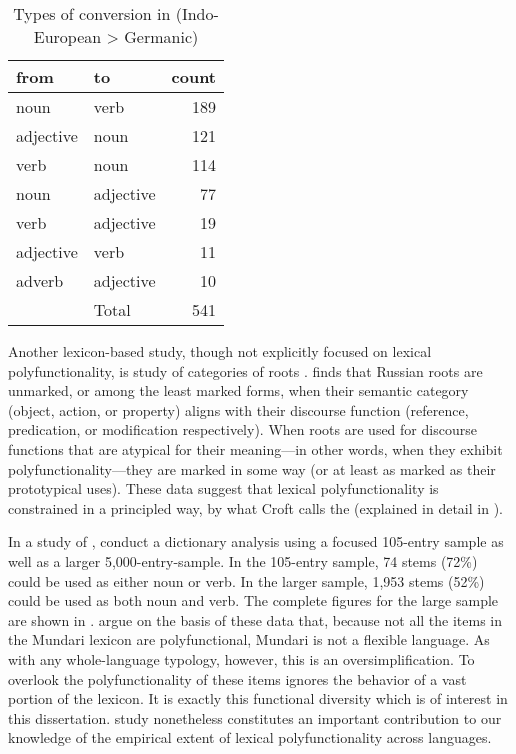\begin{table}[h]
  \centering
  \caption[Types of conversion in English (Indo-European > Germanic)]{Types of conversion in  (Indo-European > Germanic) \parencite[416]{Cannon1985}}
  \label{tab:Cannon-1985}
  \begin{tabular}{ l l r }
    \toprule
    from      & to        & count\\
    \midrule
    noun      & verb      & 189\\
    adjective & noun      & 121\\
    verb      & noun      & 114\\
    noun      & adjective & 77\\
    verb      & adjective & 19\\
    adjective & verb      & 11\\
    adverb    & adjective & 10\\
    \midrule
    { }       & Total     & 541\\
    \bottomrule
  \end{tabular}
\end{table}

Another lexicon-based study, though not explicitly focused on lexical polyfunctionality, is  study of categories of  roots . \citeauthor{Croft1991} finds that Russian roots are unmarked, or among the least marked forms, when their semantic category (object, action, or property) aligns with their discourse function (reference, predication, or modification respectively). When roots are used for discourse functions that are atypical for their meaning—in other words, when they exhibit polyfunctionality—they are marked in some way (or at least as marked as their prototypical uses). These data suggest that lexical polyfunctionality is constrained in a principled way, by what Croft calls the  (explained in detail in ).

In a study of , \textcite{EvansOsada2005} conduct a dictionary analysis using a focused 105-entry sample as well as a larger 5,000-entry-sample. In the 105-entry sample, 74 stems (72\%) could be used as either noun or verb. In the larger sample, 1,953 stems (52\%) could be used as both noun and verb. The complete figures for the large sample are shown in . \citeauthor{EvansOsada2005} argue on the basis of these data that, because not all the items in the Mundari lexicon are polyfunctional, Mundari is not a flexible language. As with any whole-language typology, however, this is an oversimplification. To overlook the polyfunctionality of these items ignores the behavior of a vast portion of the lexicon. It is exactly this functional diversity which is of interest in this dissertation.  study nonetheless constitutes an important contribution to our knowledge of the empirical extent of lexical polyfunctionality across languages.

